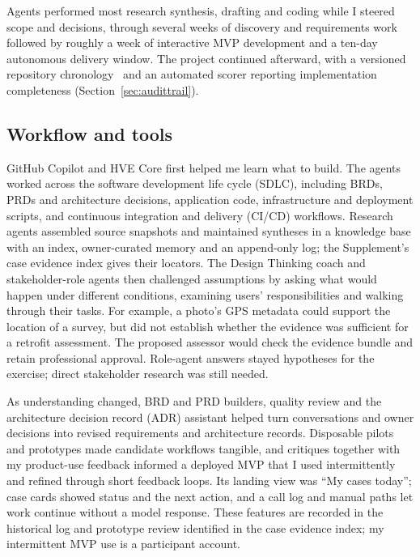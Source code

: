 \documentclass[11pt,a4paper]{article}
\begin{document}
Agents performed most research synthesis, drafting and coding while I steered scope and decisions, through several weeks of discovery and requirements work followed by roughly a week of interactive MVP development and a ten-day autonomous delivery window. The project continued afterward, with a versioned repository chronology~\cite{servera2026ama} and an automated scorer reporting implementation completeness
(Section~\ref{sec:audittrail}).

\subsection{Workflow and tools}

GitHub Copilot and HVE Core first helped me learn what to build.
The agents worked across the software development life cycle (SDLC),
including BRDs, PRDs and architecture decisions, application code,
infrastructure and deployment scripts, and continuous integration and
delivery (CI/CD) workflows.
Research agents assembled source snapshots and maintained syntheses
in a knowledge base with an index, owner-curated memory and an append-only
log; the Supplement's case evidence index gives their locators.
The Design Thinking coach and stakeholder-role agents then challenged
assumptions by asking what would happen under different conditions, examining
users' responsibilities and walking through their tasks.
For example, a photo's GPS metadata could support the location of a survey,
but did not establish whether the evidence was sufficient for a retrofit
assessment. The proposed assessor would check the evidence bundle and retain professional approval.
Role-agent answers stayed hypotheses for the
exercise; direct stakeholder research was still needed.

As understanding changed, BRD and PRD builders, quality review and the
architecture decision record (ADR)
assistant helped turn conversations and owner decisions into revised
requirements and architecture records. Disposable pilots and prototypes made candidate workflows tangible, and critiques together with my product-use feedback informed a deployed MVP that I used intermittently and refined
through short feedback loops. Its landing view was
\textquotedblleft{}My cases today\textquotedblright{};
case cards showed status and the next action, and a call log and manual
paths let work continue without a model response. These features are
recorded in the historical log and prototype review identified in the
case evidence index; my intermittent MVP use is a participant account.
\end{document}
